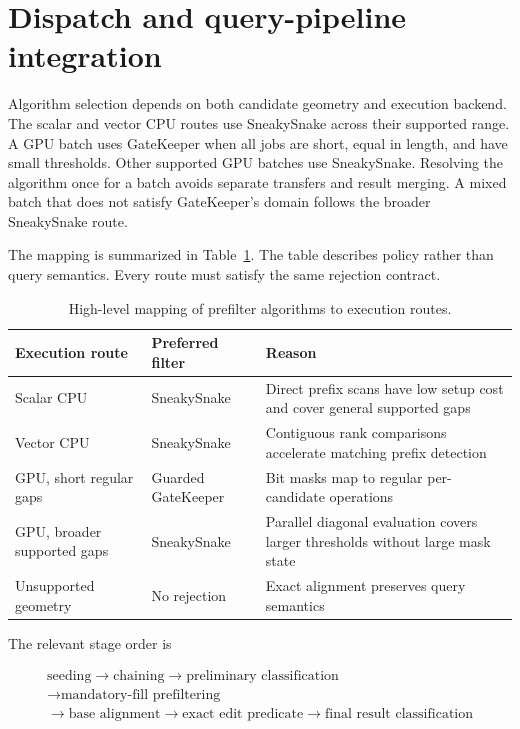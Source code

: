 \section{Dispatch and query-pipeline integration}
\label{sec:prefilter-dispatch}

Algorithm selection depends on both candidate geometry and execution backend.
The scalar and vector CPU routes use SneakySnake across their supported range.
A GPU batch uses GateKeeper when all jobs are short, equal in length, and have
small thresholds. Other supported GPU batches use SneakySnake. Resolving the
algorithm once for a batch avoids separate transfers and result merging. A
mixed batch that does not satisfy GateKeeper's domain follows the broader
SneakySnake route.

The mapping is summarized in Table~\ref{tab:prefilter-routing}. The table
describes policy rather than query semantics. Every route must satisfy the
same rejection contract.

\begin{table}[htbp]
\centering
\small
\begin{tabular}{
    >{\raggedright\arraybackslash}p{}
    >{\raggedright\arraybackslash}p{}
    >{\raggedright\arraybackslash}p{}}
\textbf{Execution route} & \textbf{Preferred filter} & \textbf{Reason}\\
\hline
Scalar CPU & SneakySnake & Direct prefix scans have low setup cost and cover
general supported gaps\\
Vector CPU & SneakySnake & Contiguous rank comparisons accelerate matching
prefix detection\\
GPU, short regular gaps & Guarded GateKeeper & Bit masks map to regular
per-candidate operations\\
GPU, broader supported gaps & SneakySnake & Parallel diagonal evaluation
covers larger thresholds without large mask state\\
Unsupported geometry & No rejection & Exact alignment preserves query
semantics\\
\end{tabular}
\caption{High-level mapping of prefilter algorithms to execution routes.}
\label{tab:prefilter-routing}
\end{table}

The relevant stage order is

\[
\begin{gathered}
\text{seeding}
\rightarrow \text{chaining}
\rightarrow \text{preliminary classification}\\
\rightarrow \text{mandatory-fill prefiltering}\\
\rightarrow \text{base alignment}
\rightarrow \text{exact edit predicate}
\rightarrow \text{final result classification}
\end{gathered}
\]

